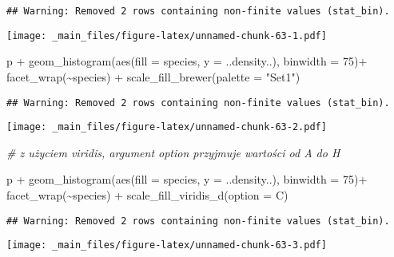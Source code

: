 \documentclass[
]{book}
\newenvironment{Shaded}{\begin{snugshade}}{\end{snugshade}}
\newcommand{\AttributeTok}[1]{\textcolor[rgb]{0.77,0.63,0.00}{#1}}
\newcommand{\CommentTok}[1]{\textcolor[rgb]{0.56,0.35,0.01}{\textit{#1}}}
\newcommand{\DecValTok}[1]{\textcolor[rgb]{0.00,0.00,0.81}{#1}}
\newcommand{\FunctionTok}[1]{\textcolor[rgb]{0.00,0.00,0.00}{#1}}
\newcommand{\NormalTok}[1]{#1}
\newcommand{\SpecialCharTok}[1]{\textcolor[rgb]{0.00,0.00,0.00}{#1}}
\newcommand{\StringTok}[1]{\textcolor[rgb]{0.31,0.60,0.02}{#1}}
\begin{document}
\begin{verbatim}
## Warning: Removed 2 rows containing non-finite values (stat_bin).
\end{verbatim}

\texttt{[image: \_main\_files/figure-latex/unnamed-chunk-63-1.pdf]}

\begin{Shaded}
\begin{Highlighting}[]
\NormalTok{p }\SpecialCharTok{+} \FunctionTok{geom\_histogram}\NormalTok{(}\FunctionTok{aes}\NormalTok{(}\AttributeTok{fill =}\NormalTok{ species, }\AttributeTok{y =}\NormalTok{ ..density..), }\AttributeTok{binwidth =} \DecValTok{75}\NormalTok{)}\SpecialCharTok{+}
  \FunctionTok{facet\_wrap}\NormalTok{(}\SpecialCharTok{\textasciitilde{}}\NormalTok{species) }\SpecialCharTok{+} \FunctionTok{scale\_fill\_brewer}\NormalTok{(}\AttributeTok{palette =} \StringTok{"Set1"}\NormalTok{)}
\end{Highlighting}
\end{Shaded}

\begin{verbatim}
## Warning: Removed 2 rows containing non-finite values (stat_bin).
\end{verbatim}

\texttt{[image: \_main\_files/figure-latex/unnamed-chunk-63-2.pdf]}

\begin{Shaded}
\begin{Highlighting}[]
\CommentTok{\# z użyciem viridis, argument option przyjmuje wartości od A do H}

\NormalTok{p }\SpecialCharTok{+} \FunctionTok{geom\_histogram}\NormalTok{(}\FunctionTok{aes}\NormalTok{(}\AttributeTok{fill =}\NormalTok{ species, }\AttributeTok{y =}\NormalTok{ ..density..), }\AttributeTok{binwidth =} \DecValTok{75}\NormalTok{)}\SpecialCharTok{+}
  \FunctionTok{facet\_wrap}\NormalTok{(}\SpecialCharTok{\textasciitilde{}}\NormalTok{species) }\SpecialCharTok{+} \FunctionTok{scale\_fill\_viridis\_d}\NormalTok{(}\AttributeTok{option =} \StringTok{\textquotesingle{}C\textquotesingle{}}\NormalTok{)}
\end{Highlighting}
\end{Shaded}

\begin{verbatim}
## Warning: Removed 2 rows containing non-finite values (stat_bin).
\end{verbatim}

\texttt{[image: \_main\_files/figure-latex/unnamed-chunk-63-3.pdf]}
\end{document}
